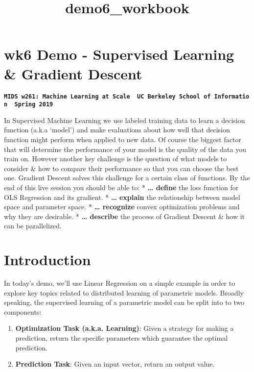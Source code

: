 \documentclass[11pt]{article}
\title{demo6\_workbook}
\providecommand{\tightlist}{%
      \setlength{\itemsep}{0pt}\setlength{\parskip}{0pt}}
\begin{document}
    
    
    \maketitle
    
    

    
    \hypertarget{wk6-demo---supervised-learning-gradient-descent}{%
\section{wk6 Demo - Supervised Learning \& Gradient
Descent}\label{wk6-demo---supervised-learning-gradient-descent}}

\textbf{\texttt{MIDS\ w261:\ Machine\ Learning\ at\ Scale\ \textbar{}\ UC\ Berkeley\ School\ of\ Information\ \textbar{}\ Spring\ 2019}}

In Supervised Machine Learning we use labeled training data to learn a
decision function (a.k.a `model') and make evaluations about how well
that decision function might perform when applied to new data. Of course
the biggest factor that will determine the performance of your model is
the quality of the data you train on. However another key challenge is
the question of what models to consider \& how to compare their
performance so that you can choose the best one. Gradient Descent solves
this challenge for a certain class of functions. By the end of this live
session you should be able to: * \textbf{\ldots{} define} the loss
function for OLS Regression and its gradient. * \textbf{\ldots{}
explain} the relationship between model space and parameter space. *
\textbf{\ldots{} recognize} convex optimization problems and why they
are desirable. * \textbf{\ldots{} describe} the process of Gradient
Descent \& how it can be parallelized.

    \hypertarget{introduction}{%
\section{Introduction}\label{introduction}}

In today's demo, we'll use Linear Regression on a simple example in
order to explore key topics related to distributed learning of
parametric models. Broadly speaking, the supervised learning of a
parametric model can be split into to two components:

\begin{enumerate}
\def\labelenumi{\arabic{enumi}.}
\tightlist
\item
  \textbf{Optimization Task (a.k.a. Learning)}: Given a strategy for
  making a prediction, return the specific parameters which guarantee
  the optimal prediction.\\
\item
  \textbf{Prediction Task}: Given an input vector, return an output
  value.
\end{enumerate}
\end{document}
